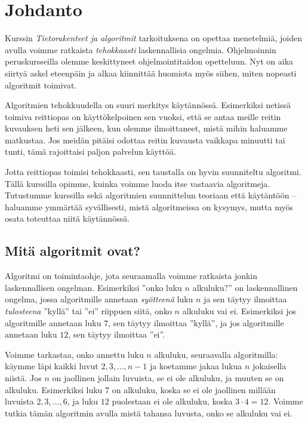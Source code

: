 \chapter{Johdanto}

Kurssin \emph{Tietorakenteet ja algoritmit} tarkoituksena
on opettaa menetelmiä, joiden avulla voimme ratkaista
\emph{tehokkaasti} laskennallisia ongelmia.
Ohjelmoinnin peruskursseilla olemme keskittyneet
ohjelmointitaidon opetteluun.
Nyt on aika siirtyä askel eteenpäin ja alkaa kiinnittää
huomiota myös siihen, miten nopeasti algoritmit toimivat.

Algoritmien tehokkuudella on suuri merkitys käytännössä.
Esimerkiksi netissä toimiva reittiopas on käyttökelpoinen sen vuoksi,
että se antaa meille reitin kuvauksen heti sen jälkeen, kun olemme
ilmoittaneet, mistä mihin haluamme matkustaa.
Jos meidän pitäisi odottaa reitin kuvausta vaikkapa minuutti tai tunti,
tämä rajoittaisi paljon palvelun käyttöä.

Jotta reittiopas toimisi tehokkaasti, sen taustalla on
hyvin suunniteltu algoritmi.
Tällä kurssilla opimme, kuinka voimme luoda itse vastaavia algoritmeja.
Tutustumme kurssilla sekä algoritmien suunnittelun teoriaan että
käytäntöön -- haluamme ymmärtää syvällisesti, mistä algoritmeissa on kysymys,
mutta myös osata toteuttaa niitä käytännössä.

\section{Mitä algoritmit ovat?}

Algoritmi on toimintaohje, jota seuraamalla voimme ratkaista
jonkin laskennallisen ongelman.
Esimerkiksi ''onko luku $n$ alkuluku?'' on laskennallinen ongelma,
jossa algoritmille annetaan \emph{syötteenä} luku $n$
ja sen täytyy ilmoittaa \emph{tulosteena} ''kyllä'' tai ''ei'' riippuen siitä,
onko $n$ alkuluku vai ei.
Esimerkiksi jos algoritmille annetaan luku $7$,
sen täytyy ilmoittaa ''kyllä'',
ja jos algoritmille annetaan luku $12$,
sen täytyy ilmoittaa ''ei''.

Voimme tarkastaa, onko annettu luku $n$ alkuluku, seuraavalla algoritmilla:
käymme läpi kaikki luvut $2,3,\dots,n-1$ ja koetamme
jakaa lukua $n$ jokaisella niistä.
Jos $n$ on jaollinen jollain luvuista, se ei ole alkuluku,
ja muuten se on alkuluku.
Esimerkiksi luku $7$ on alkuluku, koska se ei ole jaollinen
millään luvuista $2,3,\dots,6$,
ja luku $12$ puolestaan ei ole alkuluku, koska $3 \cdot 4 = 12$.
Voimme tutkia tämän algoritmin avulla mistä tahansa luvusta,
onko se alkuluku vai ei.

